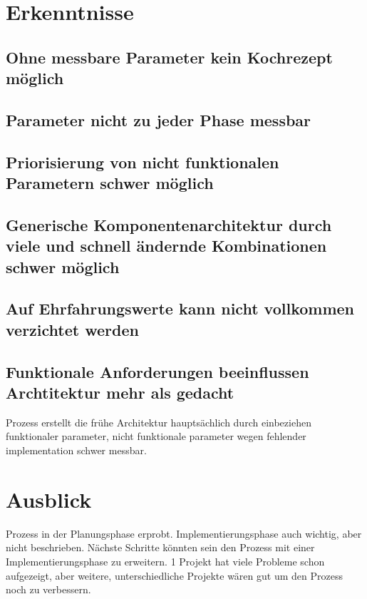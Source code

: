 \documentclass[Master,MSE,german]{twbook}
\begin{document}
\section{Erkenntnisse}
\subsection{Ohne messbare Parameter kein Kochrezept möglich}
\subsection{Parameter nicht zu jeder Phase messbar}
\subsection{Priorisierung von nicht funktionalen Parametern schwer möglich}
\subsection{Generische Komponentenarchitektur durch viele und schnell ändernde Kombinationen schwer möglich}
\subsection{Auf Ehrfahrungswerte kann nicht vollkommen verzichtet werden}
\subsection{Funktionale Anforderungen beeinflussen Archtitektur mehr als gedacht}
Prozess erstellt die frühe Architektur hauptsächlich durch einbeziehen funktionaler parameter, nicht funktionale parameter wegen fehlender implementation schwer messbar.

\section{Ausblick}
Prozess in der Planungsphase erprobt. Implementierungsphase auch wichtig, aber nicht beschrieben. Nächste Schritte könnten sein den Prozess mit einer Implementierungsphase zu erweitern. 1 Projekt hat viele Probleme schon aufgezeigt, aber weitere, unterschiedliche Projekte wären gut um den Prozess noch zu verbessern.

\clearpage


\clearpage

\listoffigures
\clearpage

\listoftables
\clearpage
\end{document}

